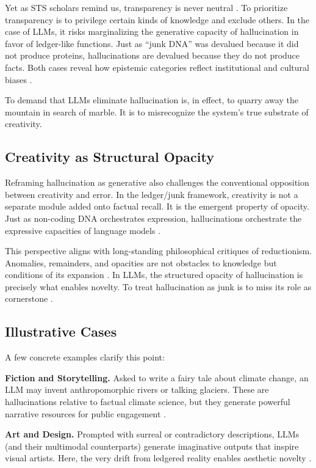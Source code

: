 \documentclass[11pt]{article}
\begin{document}
Yet as STS scholars remind us, transparency is never neutral \citep{jasanoff2004, haraway1988}. To prioritize transparency is to privilege certain kinds of knowledge and exclude others. In the case of LLMs, it risks marginalizing the generative capacity of hallucination in favor of ledger-like functions. Just as ``junk DNA'' was devalued because it did not produce proteins, hallucinations are devalued because they do not produce facts. Both cases reveal how epistemic categories reflect institutional and cultural biases \citep{glissant1997, anzadua1987}.

To demand that LLMs eliminate hallucination is, in effect, to quarry away the mountain in search of marble. It is to misrecognize the system’s true substrate of creativity.

\subsection{Creativity as Structural Opacity}
Reframing hallucination as generative also challenges the conventional opposition between creativity and error. In the ledger/junk framework, creativity is not a separate module added onto factual recall. It is the emergent property of opacity. Just as non-coding DNA orchestrates expression, hallucinations orchestrate the expressive capacities of language models \citep{rheinberger1997}.

This perspective aligns with long-standing philosophical critiques of reductionism. Anomalies, remainders, and opacities are not obstacles to knowledge but conditions of its expansion \citep{kuhn1962, feyerabend1975, bachelard1984}. In LLMs, the structured opacity of hallucination is precisely what enables novelty. To treat hallucination as junk is to miss its role as cornerstone \citep{star1989}.

\subsection{Illustrative Cases}
A few concrete examples clarify this point:

\textbf{Fiction and Storytelling.} Asked to write a fairy tale about climate change, an LLM may invent anthropomorphic rivers or talking glaciers. These are hallucinations relative to factual climate science, but they generate powerful narrative resources for public engagement \citep{bender2021}.

\textbf{Art and Design.} Prompted with surreal or contradictory descriptions, LLMs (and their multimodal counterparts) generate imaginative outputs that inspire visual artists. Here, the very drift from ledgered reality enables aesthetic novelty \citep{manovich2020}.
\end{document}
